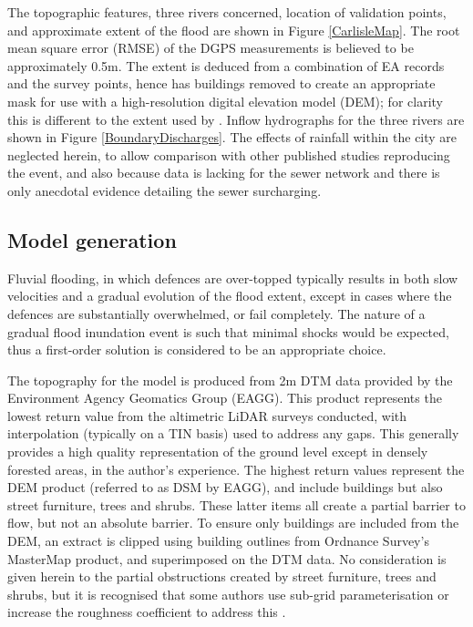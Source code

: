 The topographic features, three rivers concerned, location of validation points, and approximate extent of the flood are shown in Figure \ref{CarlisleMap}. The root mean square error (RMSE) of the DGPS measurements is believed to be approximately 0.5m. The extent is deduced from a combination of EA records and the survey points, hence has buildings removed to create an appropriate mask for use with a high-resolution digital elevation model (DEM); for clarity this is different to the extent used by \citet{Horritt2010}. Inflow hydrographs for the three rivers are shown in Figure \ref{BoundaryDischarges}. The effects of rainfall within the city are neglected herein, to allow comparison with other published studies reproducing the event, and also because data is lacking for the sewer network and there is only anecdotal evidence detailing the sewer surcharging. 

\subsection{Model generation}

Fluvial flooding, in which defences are over-topped typically results in both slow velocities and a gradual evolution of the flood extent, except in cases where the defences are substantially overwhelmed, or fail completely. The nature of a gradual flood inundation event is such that minimal shocks would be expected, thus a first-order solution is considered to be an appropriate choice.

The topography for the model is produced from 2m DTM data provided by the Environment Agency Geomatics Group (EAGG). This product represents the lowest return value from the altimetric LiDAR surveys conducted, with interpolation (typically on a TIN basis) used to address any gaps. This generally provides a high quality representation of the ground level except in densely forested areas, in the author's experience. The highest return values represent the DEM product (referred to as DSM by EAGG), and include buildings but also street furniture, trees and shrubs. These latter items all create a partial barrier to flow, but not an absolute barrier. To ensure only buildings are included from the DEM, an extract is clipped using building outlines from Ordnance Survey's MasterMap product, and superimposed on the DTM data. No consideration is given herein to the partial obstructions created by street furniture, trees and shrubs, but it is recognised that some authors use sub-grid parameterisation or increase the roughness coefficient to address this \citep[e.g.][]{Bates2003,Yu2006,Casas2010,Chen2012}.

